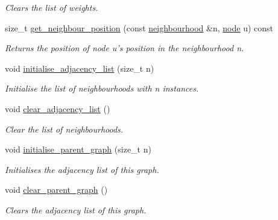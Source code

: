 \begin{DoxyCompactItemize}
\begin{DoxyCompactList}\small\item\em Clears the list of weights. \end{DoxyCompactList}\item 
size\-\_\-t \hyperlink{classlgraph_1_1utils_1_1xxgraph_aac7ef2134cad9529869f1334de7892d9}{get\-\_\-neighbour\-\_\-position} (const \hyperlink{namespacelgraph_1_1utils_a0f2ef47028a466d26841709e705390ac}{neighbourhood} \&n, \hyperlink{namespacelgraph_1_1utils_a7bd66ede3805ef121bc2835bd48de0cf}{node} u) const 
\begin{DoxyCompactList}\small\item\em Returns the position of node {\itshape u's} position in the neighbourhood {\itshape n}. \end{DoxyCompactList}\item 
\hypertarget{classlgraph_1_1utils_1_1xxgraph_a2201aaff5e9ffa29a9b3abfde705dd46}{void \hyperlink{classlgraph_1_1utils_1_1xxgraph_a2201aaff5e9ffa29a9b3abfde705dd46}{initialise\-\_\-adjacency\-\_\-list} (size\-\_\-t n)}\label{classlgraph_1_1utils_1_1xxgraph_a2201aaff5e9ffa29a9b3abfde705dd46}

\begin{DoxyCompactList}\small\item\em Initialise the list of neighbourhoods with {\itshape n} instances. \end{DoxyCompactList}\item 
\hypertarget{classlgraph_1_1utils_1_1xxgraph_a6523402d0ec66918b95de23d2bee38fc}{void \hyperlink{classlgraph_1_1utils_1_1xxgraph_a6523402d0ec66918b95de23d2bee38fc}{clear\-\_\-adjacency\-\_\-list} ()}\label{classlgraph_1_1utils_1_1xxgraph_a6523402d0ec66918b95de23d2bee38fc}

\begin{DoxyCompactList}\small\item\em Clear the list of neighbourhoods. \end{DoxyCompactList}\item 
void \hyperlink{classlgraph_1_1utils_1_1xxgraph_abd983125be7f2f2b9c812326a4a39e6d}{initialise\-\_\-parent\-\_\-graph} (size\-\_\-t n)
\begin{DoxyCompactList}\small\item\em Initialises the adjacency list of this graph. \end{DoxyCompactList}\item 
void \hyperlink{classlgraph_1_1utils_1_1xxgraph_a8d213a8dfe716d344dd51d1bd37c0e2c}{clear\-\_\-parent\-\_\-graph} ()
\begin{DoxyCompactList}\small\item\em Clears the adjacency list of this graph. \end{DoxyCompactList}\end{DoxyCompactItemize}
